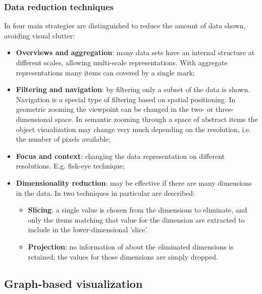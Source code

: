 \subsubsection{Data reduction techniques}\label{chapter:literature_study:section:interaction:subsection:techniques:subsubsection:reduction}

In \cite{shirley:2009} four main strategies are distinguished to reduce the amount of data shown, avoiding visual clutter:

\begin{itemize}
	\item \textbf{Overviews and aggregation}: many data sets have an internal structure at different scales, allowing multi-scale representations. With aggregate representations many items can covered by a single mark;
	\item \textbf{Filtering and navigation}: by filtering only a subset of the data is shown. Navigation is a special type of filtering based on spatial positioning. In geometric zooming the viewpoint can be changed in the two- or three-dimensional space. In semantic zooming through a space of abstract items the object visualization may change very much depending on the resolution, i.e. the number of pixels available;
	\item \textbf{Focus and context}: changing the data representation on different resolutions. E.g. fish-eye technique;
	\item \textbf{Dimensionality reduction}: may be effective if there are many dimensions in the data. In \cite{shirley:2009} two techniques in particular are described:
	\begin{itemize}
		\item \textbf{Slicing}: a single value is chosen from the dimensions to eliminate, and only the items matching that value for the dimension are extracted to include in the lower-dimensional 'slice'.
		\item \textbf{Projection}: no information of about the eliminated dimensions is retained; the values for those dimensions are simply dropped.
	\end{itemize}
\end{itemize}



\subsection{Graph-based visualization}\label{chapter:literature_study:section:interaction:subsection:graphs}

